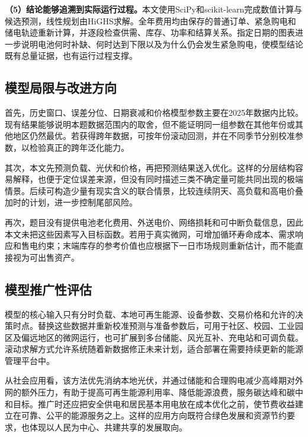 \documentclass[11pt,a4paper]{article}
\begin{document}
\textbf{（5）结论能够追溯到实际运行过程。}本文使用SciPy和scikit-learn完成数值计算与候选预测\cite{virtanen,pedregosa}，线性规划由HiGHS求解\cite{huangfu}。全年费用均由保存的普通订单、紧急购电和储电轨迹重新计算，并逐段检查供需、库存、功率和结算关系。指定日期的图表进一步说明电池何时补缺、何时达到下限以及为什么仍会发生紧急购电，使模型结论既有总量证据，也有运行过程支撑。

\subsection{模型局限与改进方向}

首先，历史窗口、误差分位、日期衰减和价格模型参数主要在2025年数据内比较。现有结果能够说明本题数据范围内的取舍，但不能证明同一组参数在其他年份或其他地区仍然最优。若获得跨年数据，可按年份滚动回测，并在不同季节分别校准参数，以检验真正的跨年泛化能力。

其次，本文先预测负载、光伏和价格，再把预测结果送入优化。这样的分层结构容易解释，也便于定位误差来源，但没有同时描述三类不确定量可能共同出现的极端情景。后续可构造少量有现实含义的联合情景，比较连续阴天、高负载和高电价叠加时的计划，进一步控制尾部风险。

再次，题目没有提供电池老化费用、外送电价、网络损耗和可中断负载信息，因此本文未把这些因素写入目标函数。若用于真实微网，可增加循环寿命成本、需求响应和售电约束；末端库存的参考价值也应根据下一日市场规则重新估计，而不能直接视为可出售资产。

\subsection{模型推广性评估}

模型的核心输入只有分时负载、本地可再生能源、设备参数、交易价格和允许的决策时点。替换这些数据并重新校准预测与准备参数后，可用于社区、校园、工业园区及偏远地区的微网运行，也可扩展到多台储能、风光互补、充电站和可调负载。滚动求解方式允许系统随着新数据修正未来计划，适合部署在需要持续更新的能源管理平台中。

从社会应用看，该方法优先消纳本地光伏，并通过储能和合理购电减少高峰期对外网的额外压力，有助于提高可再生能源利用率、降低能源浪费，服务碳达峰和碳中和目标\cite{carbonplan,energyplan}。推广时还应把安全供电和居民基本用电放在成本优化之前，使节费收益建立在可靠、公平的能源服务之上。这样的应用方向既符合绿色发展和资源节约要求，也体现以人民为中心、共建共享的发展取向。
\end{document}

